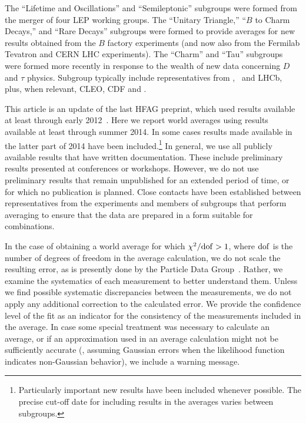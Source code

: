 The ``Lifetime and Oscillations'' and ``Semileptonic'' subgroups were formed from the merger of four LEP working groups.
The ``Unitary Triangle,'' ``$B$ to Charm Decays,'' and ``Rare Decays''
subgroups were formed to provide averages for new results obtained
from the $B$ factory experiments (and now also from the Fermilab 
Tevatron and CERN LHC experiments).
The ``Charm'' and ``Tau''  subgroups were formed more recently in 
response to the wealth of new data concerning $D$ and $\tau$ physics. 
Subgroup typically include representatives from \belle, \babar\ and LHCb, 
plus, when relevant, CLEO, CDF and \dzero. 

This article is an update of the last HFAG preprint,
which used results available at least through early 2012~\cite{Amhis:2012bh}. 
Here we report world averages using results available at least through summer 2014.
In some cases results made available in the latter part of 2014 have been
included.\footnote{
  Particularly important new results have been included whenever possible.
  The precise cut-off date for including results in the averages varies 
  between subgroups.
}
In general, we use all publicly available results that have written documentation. 
These include preliminary results presented at conferences or workshops.
However, we do not use preliminary results that remain unpublished 
for an extended period of time, or for which no publication is planned. 
Close contacts have been established between representatives from
the experiments and members of subgroups that perform averaging 
to ensure that the data are prepared in a form suitable for 
combinations.  

In the case of obtaining a world average for which $\chi^2/{\rm dof} > 1$,
where ${\rm dof}$ is the number of degrees of freedom in the average
calculation, we do not scale the resulting error, as is presently 
done by the Particle Data Group~\cite{PDG_2014}.
Rather, 
we examine the systematics of each measurement to better understand them. 
Unless we find possible systematic discrepancies between the measurements, 
we do not apply any additional correction to the calculated error. 
We provide the confidence level of the fit as an indicator for the 
consistency of the measurements included in the average. In case some
special treatment was necessary to calculate an average, or if an
approximation used in an average calculation might not be 
sufficiently accurate 
(\eg, assuming Gaussian errors when the likelihood function indicates 
non-Gaussian behavior), we include a warning message.

